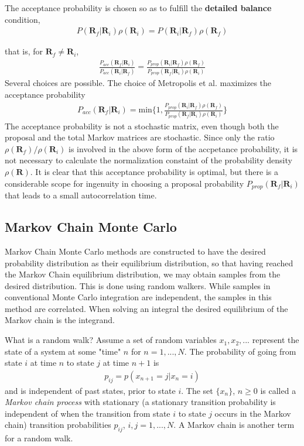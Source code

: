 \documentclass[twoside,english]{uiofysmaster}
\begin{document}
The acceptance probability is chosen so as to fulfill the \textbf{detailed balance} condition,
\begin{align}
	P(\bm{R}_f| \bm{R}_i)  \rho (\bm{R}_i) = P(\bm{R}_i| \bm{R}_f) \rho (\bm{R}_f)
\end{align}

that is, for $\bm{R}_f \neq \bm{R}_i$,
\begin{align}
	\frac{ P_{acc} (\bm{R}_f| \bm{R}_i) }{ P_{acc} (\bm{R}_i| \bm{R}_f) }
	= \frac{ P_{prop} (\bm{R}_i| \bm{R}_f) \rho (\bm{R}_f) }
	{ P_{prop} (\bm{R}_f| \bm{R}_i) \rho (\bm{R}_i) }
\end{align}
Several choices are possible. The choice of Metropolis et al. \cite{Metropolis1953} maximizes the acceptance probability
\begin{align}
	P_{acc} (\bm{R}_f | \bm{R}_i) = \text{min} \{ 1, 
	\frac{ P_{prop} (\bm{R}_i| \bm{R}_f) \rho (\bm{R}_f) }
	{ P_{prop} (\bm{R}_f| \bm{R}_i) \rho (\bm{R}_i) } \}
\end{align}
The acceptance probability is not a stochastic matrix, even though both the proposal and the total Markov matrices are stochastic. Since only the ratio $\rho (\bm{R}_f)/\rho (\bm{R}_i)$ is involved in the above form of the accpetance probability, it is not necessary to calculate the normalization constaint of the probability density $\rho (\bm{R})$. It is clear that this acceptance probability is optimal, but there is a considerable scope for ingenuity in choosing a proposal probability $P_{prop} (\bm{R}_f| \bm{R}_i)$ that leads to a small autocorrelation time.

\cite{Toulouse2016}





\subsection{Markov Chain Monte Carlo}
Markov Chain Monte Carlo methods are constructed to have the desired probability distribution as their equilibrium distribution, so that having reached the Markov Chain equilibrium distribution, we may obtain samples from the desired distribution. This is done using random walkers. While samples in conventional Monte Carlo integration are independent, the samples in this method are correlated.
When solving an integral the desired equilibrium of the Markov chain is the integrand.

What is a random walk?
Assume a set of random variables $x_1, x_2,...$ represent the state of a system at some "time" $n$ for $n=1,...,N$. The probability of going from state $i$ at time $n$ to state $j$ at time $n+1$ is
\begin{align}
	p_{ij} = p(x_{n+1} = j| x_n = i)
\end{align}
and is independent of past states, prior to state $i$. The set $\{ x_n \}$, $n\geq 0$ is called a \textit{Markov chain process} with stationary (a stationary transition probability is independent of when the transition from state $i$ to state $j$ occurs in the Markov chain) transition probabilities $p_{ij}$, $i,j=1,...,N$. A Markov chain is another term for a random walk. 
\end{document}
